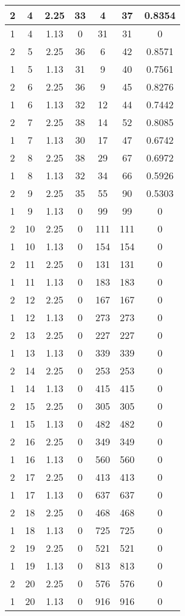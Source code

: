 \documentclass[letterpaper, 12pt]{article}
\begin{document}
\begin{longtable}{|c|c|c|c|c|c|c|}
\hline
2 & 4 & 2.25 & 33 & 4 & 37 & 0.8354 \\
\hline
1 & 4 & 1.13 & 0 & 31 & 31 & 0 \\
\hline
2 & 5 & 2.25 & 36 & 6 & 42 & 0.8571 \\
\hline
1 & 5 & 1.13 & 31 & 9 & 40 & 0.7561 \\
\hline
2 & 6 & 2.25 & 36 & 9 & 45 & 0.8276 \\
\hline
1 & 6 & 1.13 & 32 & 12 & 44 & 0.7442 \\
\hline
2 & 7 & 2.25 & 38 & 14 & 52 & 0.8085 \\
\hline
1 & 7 & 1.13 & 30 & 17 & 47 & 0.6742 \\
\hline
2 & 8 & 2.25 & 38 & 29 & 67 & 0.6972 \\
\hline
1 & 8 & 1.13 & 32 & 34 & 66 & 0.5926 \\
\hline
2 & 9 & 2.25 & 35 & 55 & 90 & 0.5303 \\
\hline
1 & 9 & 1.13 & 0 & 99 & 99 & 0 \\
\hline
2 & 10 & 2.25 & 0 & 111 & 111 & 0 \\
\hline
1 & 10 & 1.13 & 0 & 154 & 154 & 0 \\
\hline
2 & 11 & 2.25 & 0 & 131 & 131 & 0 \\
\hline
1 & 11 & 1.13 & 0 & 183 & 183 & 0 \\
\hline
2 & 12 & 2.25 & 0 & 167 & 167 & 0 \\
\hline
1 & 12 & 1.13 & 0 & 273 & 273 & 0 \\
\hline
2 & 13 & 2.25 & 0 & 227 & 227 & 0 \\
\hline
1 & 13 & 1.13 & 0 & 339 & 339 & 0 \\
\hline
2 & 14 & 2.25 & 0 & 253 & 253 & 0 \\
\hline
1 & 14 & 1.13 & 0 & 415 & 415 & 0 \\
\hline
2 & 15 & 2.25 & 0 & 305 & 305 & 0 \\
\hline
1 & 15 & 1.13 & 0 & 482 & 482 & 0 \\
\hline
2 & 16 & 2.25 & 0 & 349 & 349 & 0 \\
\hline
1 & 16 & 1.13 & 0 & 560 & 560 & 0 \\
\hline
2 & 17 & 2.25 & 0 & 413 & 413 & 0 \\
\hline
1 & 17 & 1.13 & 0 & 637 & 637 & 0 \\
\hline
2 & 18 & 2.25 & 0 & 468 & 468 & 0 \\
\hline
1 & 18 & 1.13 & 0 & 725 & 725 & 0 \\
\hline
2 & 19 & 2.25 & 0 & 521 & 521 & 0 \\
\hline
1 & 19 & 1.13 & 0 & 813 & 813 & 0 \\
\hline
2 & 20 & 2.25 & 0 & 576 & 576 & 0 \\
\hline
1 & 20 & 1.13 & 0 & 916 & 916 & 0 \\
\hline
\end{longtable}
\end{document}
